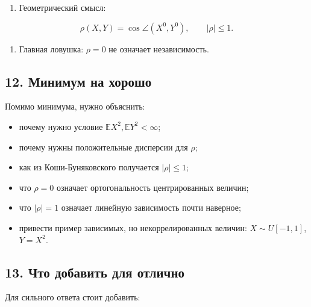 \documentclass[
  11pt,
  a4paper,
]{article}
\providecommand{\tightlist}{%
  \setlength{\itemsep}{0pt}\setlength{\parskip}{0pt}}
\begin{document}
\begin{enumerate}
\def\labelenumi{\arabic{enumi}.}
\setcounter{enumi}{3}
\tightlist
\item
  Геометрический смысл:
\end{enumerate}

\[
\rho(X,Y)=\cos\angle(X^0,Y^0),
\qquad
|\rho|\le1.
\]

\begin{enumerate}
\def\labelenumi{\arabic{enumi}.}
\setcounter{enumi}{4}
\tightlist
\item
  Главная ловушка: \(\rho=0\) не означает независимость.
\end{enumerate}

\subsection{12. Минимум на
хорошо}\label{ux43cux438ux43dux438ux43cux443ux43c-ux43dux430-ux445ux43eux440ux43eux448ux43e}

Помимо минимума, нужно объяснить:

\begin{itemize}
\tightlist
\item
  почему нужно условие \(\mathbb EX^2,\mathbb EY^2<\infty\);
\item
  почему нужны положительные дисперсии для \(\rho\);
\item
  как из Коши-Буняковского получается \(|\rho|\le1\);
\item
  что \(\rho=0\) означает ортогональность центрированных величин;
\item
  что \(|\rho|=1\) означает линейную зависимость почти наверное;
\item
  привести пример зависимых, но некоррелированных величин:
  \(X\sim U[-1,1]\), \(Y=X^2\).
\end{itemize}

\subsection{13. Что добавить для
отлично}\label{ux447ux442ux43e-ux434ux43eux431ux430ux432ux438ux442ux44c-ux434ux43bux44f-ux43eux442ux43bux438ux447ux43dux43e}

Для сильного ответа стоит добавить:
\end{document}
